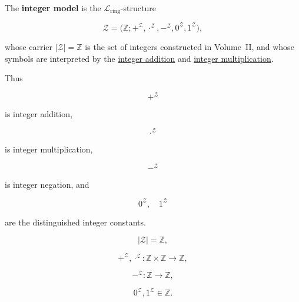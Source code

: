 \begin{definition}
\label{def:integer-model}

The \textbf{integer model} is the
$\mathcal{L}_{\mathrm{ring}}$-structure

\[
\mathcal{Z}
=
\bigl(
\mathbb{Z};
+^{\mathcal Z},
\cdot^{\mathcal Z},
-^{\mathcal Z},
0^{\mathcal Z},
1^{\mathcal Z}
\bigr),
\]

whose carrier $|\mathcal Z|=\mathbb Z$ is the set of integers constructed in
Volume~II, and whose symbols are interpreted by the
\hyperref[def:addition-on-z-classes]{integer addition} and
\hyperref[def:multiplication-on-z-classes]{integer multiplication}.

Thus

\[
+^{\mathcal Z}
\]

is integer addition,

\[
\cdot^{\mathcal Z}
\]

is integer multiplication,

\[
-^{\mathcal Z}
\]

is integer negation, and

\[
0^{\mathcal Z},
\quad
1^{\mathcal Z}
\]

are the distinguished integer constants.
\end{definition}


\begin{remark*}

\[
|\mathcal Z|
=
\mathbb Z,
\]

\[
+^{\mathcal Z},
\cdot^{\mathcal Z}
:
\mathbb Z\times\mathbb Z
\to
\mathbb Z,
\]

\[
-^{\mathcal Z}
:
\mathbb Z
\to
\mathbb Z,
\]

\[
0^{\mathcal Z},
1^{\mathcal Z}
\in
\mathbb Z.
\]

\end{remark*}


